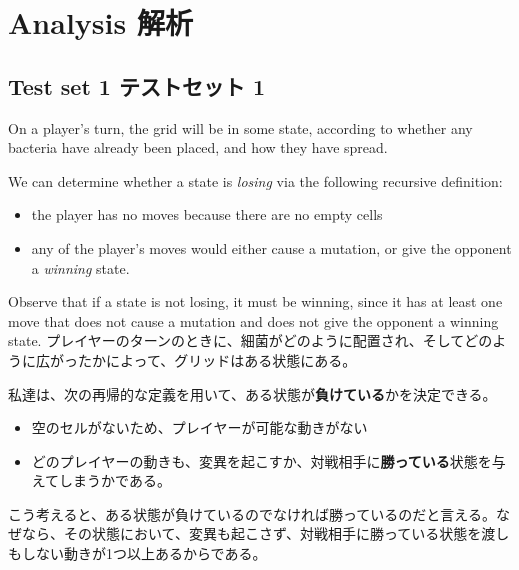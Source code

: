 \documentclass[uplatex,dvipdfmx]{jsarticle} \usepackage{amsmath,amssymb,bm}
\begin{document}
\section*{Analysis 解析}
\subsection*{Test set 1 テストセット 1}
\begin{paracol}{2}
On a player's turn, the grid will be in some state, according to whether any bacteria have already been placed, and how they have spread.

We can determine whether a state is {\it losing} via the following recursive definition:

\begin{itemize}
\item the player has no moves because there  are no empty cells
\item any of the player's moves would either cause a mutation, or give the opponent a {\it winning} state.
\end{itemize}

Observe that if a state is not losing, it must be winning, since it has at least one move that does not cause a mutation and does not give the opponent a winning state.
\switchcolumn
プレイヤーのターンのときに、細菌がどのように配置され、そしてどのように広がったかによって、グリッドはある状態にある。

私達は、次の再帰的な定義を用いて、ある状態が{\bf 負けている}かを決定できる。

\begin{itemize}
\item 空のセルがないため、プレイヤーが可能な動きがない
\item どのプレイヤーの動きも、変異を起こすか、対戦相手に{\bf 勝っている}状態を与えてしまうかである。
\end{itemize}

こう考えると、ある状態が負けているのでなければ勝っているのだと言える。なぜなら、その状態において、変異も起こさず、対戦相手に勝っている状態を渡しもしない動きが1つ以上あるからである。
\end{paracol}
\vspace{\baselineskip}
\end{document}
